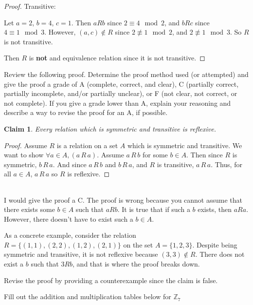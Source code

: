 \documentclass[12 pt]{exam}
\newtheorem{claim}{Claim}
\begin{document}
\begin{questions}
\begin{solution}
\begin{proof}
Transitive:

Let $a = 2$, $b = 4$, $c = 1$. Then $aRb$ since $2 \equiv 4 \mod 2$, and $bRc$ since $4 \equiv 1 \mod 3$.
However, $(a,c) \notin R$ since $2 \not \equiv 1 \mod 2$, and $2 \not \equiv 1 \mod 3$. So $R$ is not transitive.

Then $R$ is \textbf{not} and equivalence relation since it is not transitive.
\end{proof}\end{solution}


\question Review the following proof. Determine the proof method used (or attempted) and give the proof a grade of A (complete, correct, and clear), C (partially correct, partially incomplete, and/or partially unclear), or F (not clear, not correct, or not complete). If you give a grade lower than A, explain your reasoning and describe a way to revise the proof for an A, if possible.

\begin{claim} Every relation which is symmetric and transitive is reflexive. \end{claim}

\begin{proof}
Assume $R$ is a relation on a set $A$ which is symmetric and transitive. We want to show $\forall a \in A, (a \, R \,a)$.  Assume $a\, R \,b$ for some $b \in A$. Then since $R$ is symmetric, $b\, R \,a.$  And since $a\, R \,b$ and $b\, R \,a$, and $R$ is transitive, $a\, R \,a.$  Thus, for all $a \in A$, $a\, R \,a$ so $R$ is reflexive.  
\end{proof}

\begin{solution}\\
I would give the proof a C. The proof is wrong because you cannot assume that there exists some $b \in A$ such
that $a R b$. It is true that if such a $b$ exists, then $aRa$. However, there doesn't have to exist such a
$b \in A$.

As a concrete example, consider the relation $R = \{(1, 1), (2, 2), (1, 2), (2, 1)\}$ on the set $A = \{1,2,3\}$.
Despite being symmetric and transitive, it is not reflexive because $(3, 3) \notin R$. There does not exist
a $b$ such that $3Rb$, and that is where the proof breaks down.

Revise the proof by providing a counterexample since the claim is false.
\end{solution}



\question Fill out the addition and multiplication tables below for $\mathbb{Z}_7$



\end{questions}
\end{document}
